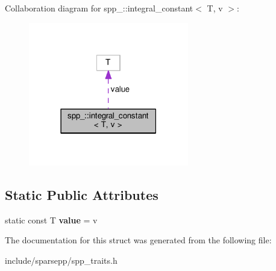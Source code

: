 Collaboration diagram for spp\+\_\+\+:\+:integral\+\_\+constant$<$ T, v $>$\+:\nopagebreak
\begin{figure}[H]
\begin{center}
\leavevmode
\includegraphics[width=198pt]{structspp___1_1integral__constant__coll__graph}
\end{center}
\end{figure}
\subsection*{Static Public Attributes}
\begin{DoxyCompactItemize}
\item 
static const T {\bfseries value} = v\hypertarget{structspp___1_1integral__constant_a820280bb0a8bdcb52886e4568f46c65d}{}\label{structspp___1_1integral__constant_a820280bb0a8bdcb52886e4568f46c65d}

\end{DoxyCompactItemize}


The documentation for this struct was generated from the following file\+:\begin{DoxyCompactItemize}
\item 
include/sparsepp/spp\+\_\+traits.\+h\end{DoxyCompactItemize}
